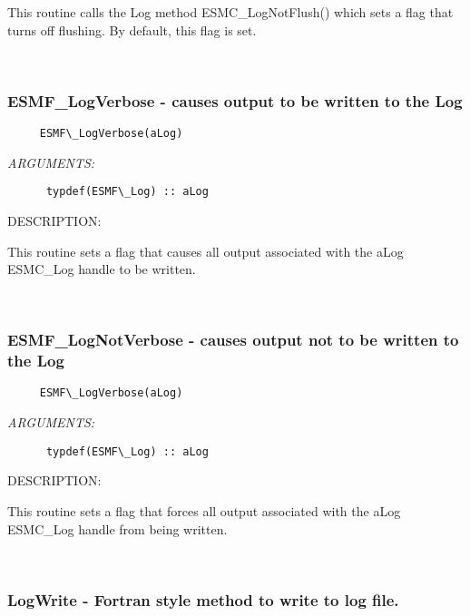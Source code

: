       This routine calls the Log method ESMC\_LogNotFlush() which sets a flag
      that turns off flushing. By default, this flag is set.
   
 
\mbox{}\hrulefill\ 
 
\subsubsection [ESMF\_LogVerbose] {ESMF\_LogVerbose - causes output to be written to the Log}


  
\begin{verbatim}     ESMF\_LogVerbose(aLog)\end{verbatim}{\em ARGUMENTS:}
\begin{verbatim}      typdef(ESMF\_Log) :: aLog\end{verbatim}
{\sf DESCRIPTION:\\ }


      This routine sets a flag that causes all output associated with
      the aLog ESMC\_Log handle to be written. 
 
\mbox{}\hrulefill\ 
 
\subsubsection [ESMF\_LogNotVerbose] {ESMF\_LogNotVerbose - causes output not to be written to the Log}


                         
\begin{verbatim}     ESMF\_LogVerbose(aLog)\end{verbatim}{\em ARGUMENTS:}
\begin{verbatim}      typdef(ESMF\_Log) :: aLog\end{verbatim}
{\sf DESCRIPTION:\\ }


      This routine sets a flag that forces all output associated with
      the aLog ESMC\_Log handle from being written. 
 
\mbox{}\hrulefill\ 
 

  \subsubsection [LogWrite] {LogWrite - Fortran style method to write to log file.}


